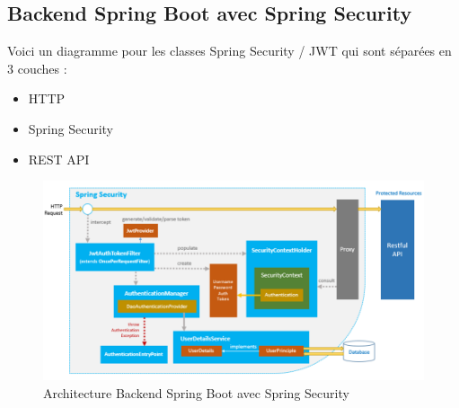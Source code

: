 \subsection{	Backend Spring Boot avec Spring Security }
\hspace{4mm}Voici un diagramme pour les classes Spring Security / JWT qui sont séparées en 3 couches \cite{3}:
\begin{itemize}
    \item 	HTTP
    \item 	Spring Security
    \item 	REST API
\end{itemize}
\newpage
\begin{figure}[h]
    \centering
    \includegraphics{figures/3anis1.png}
    \caption{Architecture Backend Spring Boot avec Spring Security \cite{3}}
    \label{fig:arch_backend}
\end{figure}
